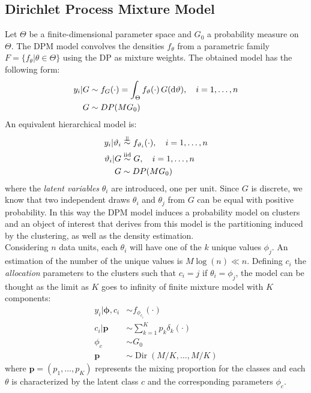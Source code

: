 \subsection{Dirichlet Process Mixture Model}
Let $\Theta$ be a finite-dimensional parameter space and $G_0$ a probability measure on $\Theta$.
The DPM model convolves the densities $f_\theta$ from a parametric family $F =\{f_\theta| \theta \in \Theta \}$ using the DP as mixture weights.
The obtained model has the following form:
\begin{align}\label{dpm-1}
			y_i | G &\sim f_G(\cdot) = \int_\Theta f_{\vartheta}(\cdot) \, G(\mathrm d\vartheta), \quad i=1,\dots,n \\
			G &\sim DP(M G_0) \nonumber
\end{align}
An equivalent hierarchical model is:
\begin{align}\label{dpm-2}
	y_i | \theta_i &\indsim f_{\theta_i}(\cdot), \quad i=1,\dots,n \\
	\theta_i | G &\iidsim G, \quad i=1,\dots,n \nonumber \\ 
	G &\sim DP(M G_0) \nonumber
\end{align}
where the \textit{latent variables} $\theta_i$ are introduced, one per unit.
Since $G$ is discrete, we know that two independent draws $\theta_i$ and $\theta_j$ from $G$ can be equal with positive probability.
In this way the DPM model induces a probability model on clusters and an object of interest that derives from this model is the partitioning induced by the clustering, as well as the density estimation. \\
Considering $n$ data units, each $\theta_i$ will have one of the $k$ unique values $\phi_{j}$. An estimation of the number of the unique values is $M\log(n) \ll n$. Defining  $c_i$ the \textit{allocation} parameters to the clusters such that $c_i = j$ if $\theta_i = \phi_j$, the model can be thought as the limit as $K$ goes to infinity of
finite mixture model with $K$ components:
\begin{align}\label{dpm-disc}
	y_{i}|\mathbf{\phi},c_{i} &\sim f_{\phi_{c_{i}}}(\cdot) \\
   	c_{i}|\mathit{\mathbf{p}}&\sim \sum_{k=1}^K\mathit{p_k} \delta_k(\cdot) \nonumber \\
    \phi_{c} & \sim G_{0} \nonumber \\
    \mathbf{p} &\sim \operatorname{Dir}(M/K,\dots,M/K) \nonumber
\end{align}
where $\mathbf{p}=(p_1,\dots,p_K)$ represents the mixing proportion for the classes and each $\theta$ is characterized by the latent class $c$ and the corresponding parameters $\phi_c$.

